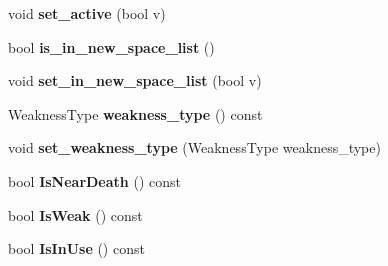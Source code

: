 \begin{DoxyCompactItemize}
\item 
void {\bfseries set\+\_\+active} (bool v)\hypertarget{classv8_1_1internal_1_1_global_handles_1_1_node_ab7c0d8ac01eee93f71b327289be7da1c}{}\label{classv8_1_1internal_1_1_global_handles_1_1_node_ab7c0d8ac01eee93f71b327289be7da1c}

\item 
bool {\bfseries is\+\_\+in\+\_\+new\+\_\+space\+\_\+list} ()\hypertarget{classv8_1_1internal_1_1_global_handles_1_1_node_a6e5d7f117ce0a0b8e7344c233f3dddb4}{}\label{classv8_1_1internal_1_1_global_handles_1_1_node_a6e5d7f117ce0a0b8e7344c233f3dddb4}

\item 
void {\bfseries set\+\_\+in\+\_\+new\+\_\+space\+\_\+list} (bool v)\hypertarget{classv8_1_1internal_1_1_global_handles_1_1_node_a5596327b1faad5b93b95132395792fb5}{}\label{classv8_1_1internal_1_1_global_handles_1_1_node_a5596327b1faad5b93b95132395792fb5}

\item 
Weakness\+Type {\bfseries weakness\+\_\+type} () const \hypertarget{classv8_1_1internal_1_1_global_handles_1_1_node_a49a2f292dcf8f5789b843f4a4f8a058c}{}\label{classv8_1_1internal_1_1_global_handles_1_1_node_a49a2f292dcf8f5789b843f4a4f8a058c}

\item 
void {\bfseries set\+\_\+weakness\+\_\+type} (Weakness\+Type weakness\+\_\+type)\hypertarget{classv8_1_1internal_1_1_global_handles_1_1_node_abaca36fa2c23fd6b16cf86d9ab11f86b}{}\label{classv8_1_1internal_1_1_global_handles_1_1_node_abaca36fa2c23fd6b16cf86d9ab11f86b}

\item 
bool {\bfseries Is\+Near\+Death} () const \hypertarget{classv8_1_1internal_1_1_global_handles_1_1_node_a4dc934f7e29da84517aa8ebd29a9f5c7}{}\label{classv8_1_1internal_1_1_global_handles_1_1_node_a4dc934f7e29da84517aa8ebd29a9f5c7}

\item 
bool {\bfseries Is\+Weak} () const \hypertarget{classv8_1_1internal_1_1_global_handles_1_1_node_abc52cedd40e2532a2bb2a44b8509eba3}{}\label{classv8_1_1internal_1_1_global_handles_1_1_node_abc52cedd40e2532a2bb2a44b8509eba3}

\item 
bool {\bfseries Is\+In\+Use} () const \hypertarget{classv8_1_1internal_1_1_global_handles_1_1_node_a1286b7cea1fa873d5523bd8f05862915}{}\label{classv8_1_1internal_1_1_global_handles_1_1_node_a1286b7cea1fa873d5523bd8f05862915}


\end{DoxyCompactItemize}
